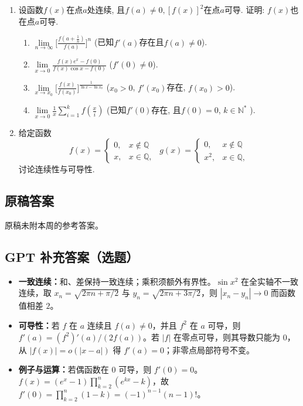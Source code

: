 \documentclass[UTF8,11pt, a4paper, oneside, fontset=none]{ctexbook}
\begin{document}
\begin{enumerate}
\item 设函数$f(x)$在点$a$处连续, 且$f(a) \neq 0, [f(x)]^2$在点$a$可导. 证明: $f(x)$也在点$a$可导. 
\begin{enumerate}
\item $\lim\limits_{n \to \infty} \Big[\frac{f(a + \frac{1}{n})}{f(a)}\Big]^n$ (已知$f'(a)$存在且$f(a) \neq 0$).
\item $\lim\limits_{x \to 0} \frac{f(x) e^x -f(0)}{f(x) \cos x - f(0)}$ ($f'(0) \neq 0$).
\item $\lim\limits_{x \to x_0} \Big[ \frac{f(x)}{f(x_0)}\Big]^{\frac{1}{\ln x- \ln x_0}}$ ($x_0>0$, $f'(x_0)$存在, $f(x_0)>0$).
\item $\lim\limits_{x \to 0} \frac{1}{x} \sum_{i=1}^k f\left( \frac{x}{i}\right)$ (已知$f'(0)$存在, 且$f(0) =0$, $k \in \mathbb N^*$ ).
\end{enumerate}

\item 给定函数
\[
f(x) = \begin{cases}
0, & x \notin \mathbb Q\\
x, & x \in \mathbb Q,
\end{cases} \ \ 
g(x) =  \begin{cases}
0, & x \notin \mathbb Q\\
x^2, & x \in \mathbb Q,
\end{cases}
\]
讨论连续性与可导性.
\end{enumerate}
\clearpage
\subsection*{原稿答案}
\noindent 原稿未附本周的参考答案。
\clearpage
\subsection*{GPT 补充答案（选题）}
\begin{itemize}
\item \textbf{一致连续：}和、差保持一致连续；乘积须额外有界性。$\sin x^2$ 在全实轴不一致连续，取 $x_n=\sqrt{2\pi n+\pi/2}$ 与 $y_n=\sqrt{2\pi n+3\pi/2}$，则 $|x_n-y_n|\to0$ 而函数值相差 $2$。
\item \textbf{可导性：}若 $f$ 在 $a$ 连续且 $f(a)\ne0$，并且 $f^2$ 在 $a$ 可导，则 $f'(a)=(f^2)'(a)/(2f(a))$。若 $|f|$ 在零点可导，则其导数只能为 $0$，从 $|f(x)|=o(|x-a|)$ 得 $f'(a)=0$；非零点局部符号不变。
\item \textbf{例子与运算：}若偶函数在 $0$ 可导，则 $f'(0)=0$。$f(x)=(e^x-1)\prod_{k=2}^n(e^{kx}-k)$，故 $f'(0)=\prod_{k=2}^n(1-k)=(-1)^{n-1}(n-1)!$。
\end{itemize}
\clearpage
\end{document}
